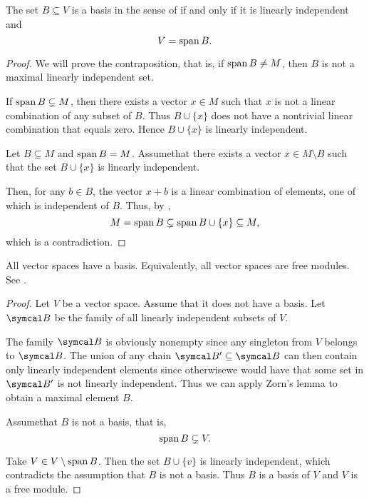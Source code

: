 \begin{proposition}\label{thm:vector_space_basis}
  The set \( B \subseteq V \) is a basis in the sense of  if and only if it is linearly independent and
  \begin{equation*}
    V = \operatorname{span}{B}.
  \end{equation*}
\end{proposition}
\begin{proof}
  \Implies We will prove the contraposition, that is, if \( \operatorname{span}{B} \neq M \), then \( B \) is not a maximal linearly independent set.

  If \( \operatorname{span}{B} \subsetneq M \), then there exists a vector \( x \in M \) such that \( x \) is not a linear combination of any subset of \( B \). Thus \( B \cup \{ x \} \) does not have a nontrivial linear combination that equals zero. Hence \( B \cup \{ x \} \) is linearly independent.

  \ImpliedBy Let \( B \subseteq M \) and \( \operatorname{span}{B} = M \). Assume\LEM that there exists a vector \( x \in M \setminus B \) such that the set \( B \cup \{ x \} \) is linearly independent.

  Then, for any \( b \in B \), the vector \( x + b \) is a linear combination of elements, one of which is independent of \( B \). Thus, by ,
  \begin{equation*}
    M = \operatorname{span}{B} \subsetneq \operatorname{span}{B \cup \{ x \}} \subseteq M,
  \end{equation*}
  which is a contradiction.
\end{proof}

\begin{theorem}\label{thm:all_vector_spaces_are_free_left_modules}
  All vector spaces have a basis. Equivalently, all vector spaces are free modules. See .
\end{theorem}
\begin{proof}
  Let \( V \) be a vector space. Assume that it does not have a basis. Let \( \Cal{B} \) be the family of all linearly independent subsets of \( V \).

  The family \( \Cal{B} \) is obviously nonempty since any singleton from \( V \) belongs to \( \Cal{B} \). The union of any chain \( \Cal{B}' \subseteq \Cal{B} \) can then contain only linearly independent elements since otherwise\LEM we would have that some set in \( \Cal{B}' \) is not linearly independent. Thus we can apply Zorn's lemma to obtain a maximal element \( B \).

  Assume\LEM that \( B \) is not a basis, that is,
  \begin{equation*}
    \operatorname{span} B \subsetneq V.
  \end{equation*}

  Take \( V \in V \setminus \operatorname{span} B \). Then the set \( B \cup \{ v \} \) is linearly independent, which contradicts the assumption that \( B \) is not a basis. Thus \( B \) is a basis of \( V \) and \( V \) is a free module.
\end{proof}

